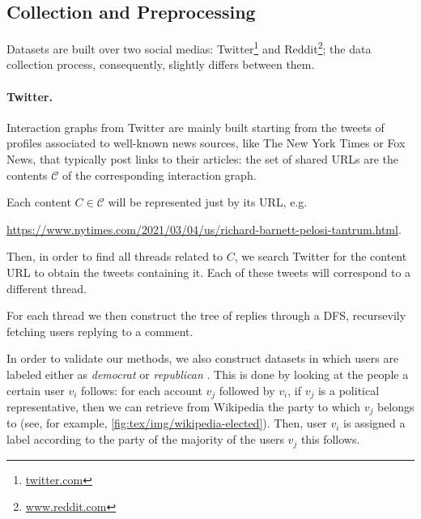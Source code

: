 \subsection{Collection and Preprocessing}%
\label{sub:collection_and_preprocessing}

Datasets are built over two social medias:
Twitter\footnote{\url{twitter.com}} and Reddit\footnote{\url{www.reddit.com}}; the data
collection process, consequently, slightly differs between them.

\paragraph{Twitter.}%
\label{par:twitter-data}

Interaction graphs from Twitter are mainly built starting from the tweets
of profiles associated to well-known news sources, like The
New York Times or Fox News, that typically post links to their articles:
the set of shared URLs are the contents $\mathcal{C} $ of the corresponding interaction graph.


Each content $C \in \mathcal{C}$ will be represented just by its URL,
e.g.

	{\footnotesize
		\begin{center}
			\url{https://www.nytimes.com/2021/03/04/us/richard-barnett-pelosi-tantrum.html}.
		\end{center}
	}

Then, in order to find all threads related to $C$, we search Twitter for
the content URL to obtain the tweets containing it. Each of these tweets
will correspond to a different thread.

For each thread we then construct the tree of replies through a DFS,
recursevily fetching users replying to a comment.

\medskip

In order to validate our methods, we also construct datasets in which users are labeled either as
\emph{democrat} or \emph{republican} \footnotemark. This is done by looking at the people a
certain user $v_i$ follows: for each account $v_j$ followed by $v_i$, if $v_j$ is a political representative, then we can
retrieve from Wikipedia the party to which $v_j$ belongs to (see, for
example, \autoref{fig:tex/img/wikipedia-elected}). Then, user $v_i$ is assigned a
label according to the party of the majority of the users $v_j$ this
follows.

